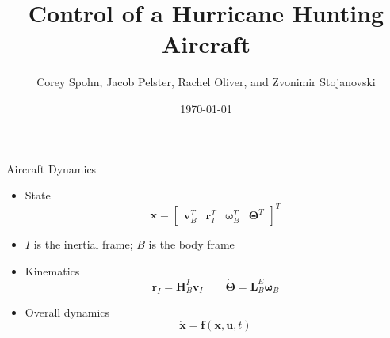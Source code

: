 \documentclass[aspectratio=169]{beamer}
\begin{document}

\title[Your Short Title]{Control of a Hurricane Hunting Aircraft}
\author{Corey Spohn, Jacob Pelster, Rachel Oliver, and Zvonimir Stojanovski}
\date{\today}

\begin{frame}
  \titlepage
\end{frame}

\begin{frame}{Aircraft Dynamics}
    \begin{itemize}
        \item State
        \begin{equation*}
            \mathbf{x} = \begin{bmatrix}
                \mathbf{v}_B^T &
                \mathbf{r}_I^T &
                \boldsymbol{\omega}_B^T &
                \boldsymbol{\Theta}^T
            \end{bmatrix}^T
        \end{equation*}
        \item $I$ is the inertial frame; $B$ is the body frame
        \item Kinematics
        \begin{equation*}
            \dot{\mathbf{r}}_I = \mathbf{H}_B^I \mathbf{v}_I \qquad
            \dot{\boldsymbol{\Theta}} = \mathbf{L}_B^E \boldsymbol{\omega}_B
        \end{equation*}
        \item Overall dynamics
        \begin{equation*}
            \dot{\mathbf{x}} = \mathbf{f}(\mathbf{x},\mathbf{u},t)
        \end{equation*}
    \end{itemize}
\end{frame}
\end{document}
